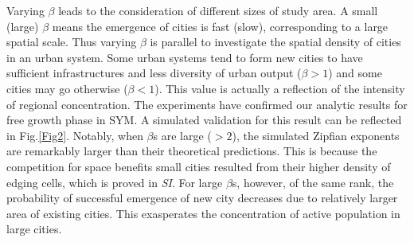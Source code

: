 \documentclass[reprint,unsortedaddress,amsmath,amssymb,aps,prl,showkeys]{revtex4-2}
\begin{document}
Varying $\beta$ leads to the consideration of different sizes of study area. A small (large) $\beta$ means the emergence of cities is fast (slow), corresponding to a large spatial scale. %
Thus varying $\beta$ is parallel to investigate the spatial density of cities in an urban system. Some urban systems tend to form new cities to have sufficient infrastructures and less diversity of urban output ($\beta > 1$) and some cities may go otherwise ($\beta< 1$). This value is actually a reflection of the intensity of regional concentration. The experiments have confirmed our analytic results for free growth phase in SYM. %
A simulated validation for this result can be reflected in Fig.\ref{Fig2}. Notably, when $\beta$s are large ($>2$), the simulated Zipfian exponents are remarkably larger than their theoretical predictions. This is because the competition for space benefits small %
cities resulted from their higher density of edging cells, which is proved in \textit{SI}. For large $\beta$s, however, of the same rank, the probability of successful emergence of new city decreases due to relatively larger area of existing cities. This exasperates the concentration of active population in large cities.%
\end{document}
